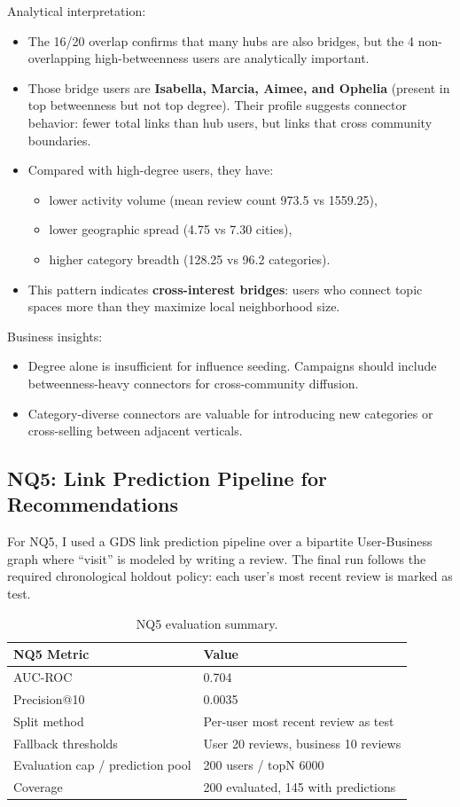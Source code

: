 \documentclass[11pt,a4paper]{article}
\begin{document}
Analytical interpretation:
\begin{itemize}
    \item The 16/20 overlap confirms that many hubs are also bridges, but the 4 non-overlapping high-betweenness users are analytically important.
    \item Those bridge users are \textbf{Isabella, Marcia, Aimee, and Ophelia} (present in top betweenness but not top degree). Their profile suggests connector behavior: fewer total links than hub users, but links that cross community boundaries.
    \item Compared with high-degree users, they have:
    \begin{itemize}
        \item lower activity volume (mean review count 973.5 vs 1559.25),
        \item lower geographic spread (4.75 vs 7.30 cities),
        \item higher category breadth (128.25 vs 96.2 categories).
    \end{itemize}
    \item This pattern indicates \textbf{cross-interest bridges}: users who connect topic spaces more than they maximize local neighborhood size.
\end{itemize}

Business insights:
\begin{itemize}
    \item Degree alone is insufficient for influence seeding. Campaigns should include betweenness-heavy connectors for cross-community diffusion.
    \item Category-diverse connectors are valuable for introducing new categories or cross-selling between adjacent verticals.
\end{itemize}

\subsection*{NQ5: Link Prediction Pipeline for Recommendations}
For NQ5, I used a GDS link prediction pipeline over a bipartite User-Business graph where ``visit'' is modeled by writing a review. The final run follows the required chronological holdout policy: each user's most recent review is marked as test.

\begin{table}[H]
\centering
\small
\begin{tabular}{ll}
\toprule
\textbf{NQ5 Metric} & \textbf{Value} \\
\midrule
AUC-ROC & 0.704 \\
Precision@10 & 0.0035 \\
Split method & Per-user most recent review as test \\
Fallback thresholds & User 20 reviews, business 10 reviews \\
Evaluation cap / prediction pool & 200 users / topN 6000 \\
Coverage & 200 evaluated, 145 with predictions \\
\bottomrule
\end{tabular}
\caption{NQ5 evaluation summary.}
\end{table}
\end{document}

